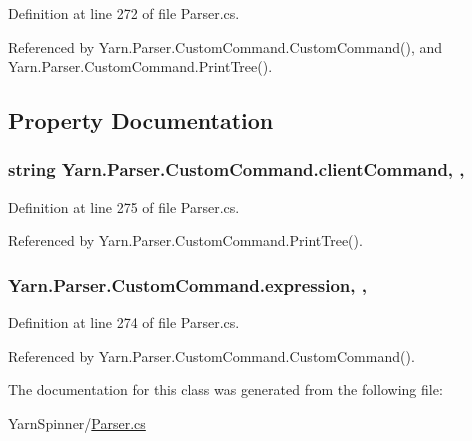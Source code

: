 Definition at line 272 of file Parser.\-cs.



Referenced by Yarn.\-Parser.\-Custom\-Command.\-Custom\-Command(), and Yarn.\-Parser.\-Custom\-Command.\-Print\-Tree().



\subsection{Property Documentation}
\hypertarget{a00077_a1a362244273df822233359d8fe4e9f5d}{
\subsubsection[{client\-Command}]{\setlength{\rightskip}{0pt plus 5cm}string Yarn.\-Parser.\-Custom\-Command.\-client\-Command\hspace{0.3cm}{\ttfamily [get]}, {\ttfamily [set]}, {\ttfamily [package]}}}\label{a00077_a1a362244273df822233359d8fe4e9f5d}


Definition at line 275 of file Parser.\-cs.



Referenced by Yarn.\-Parser.\-Custom\-Command.\-Print\-Tree().

\hypertarget{a00077_a4250d192d5b58e2404a14c68eb616f16}{
\subsubsection[{expression}]{ Yarn.\-Parser.\-Custom\-Command.\-expression\hspace{0.3cm}{\ttfamily [get]}, {\ttfamily [set]}, {\ttfamily [package]}}}\label{a00077_a4250d192d5b58e2404a14c68eb616f16}


Definition at line 274 of file Parser.\-cs.



Referenced by Yarn.\-Parser.\-Custom\-Command.\-Custom\-Command().



The documentation for this class was generated from the following file\-:\begin{DoxyCompactItemize}
\item 
Yarn\-Spinner/\hyperlink{a00301}{Parser.\-cs}\end{DoxyCompactItemize}
